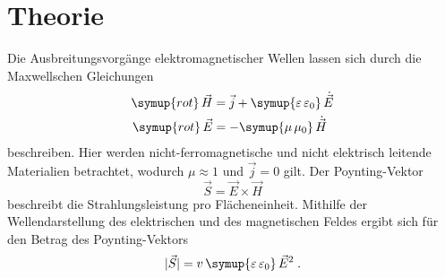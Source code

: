 \section{Theorie}
\label{sec:Theorie}

Die Ausbreitungsvorgänge elektromagnetischer Wellen lassen sich durch die Maxwellschen Gleichungen 
\begin{align*}
    \symup{rot}\, \vec{H} &= \vec{j} + \symup{\varepsilon \,\varepsilon_0}\,\dot{\vec{E}} \\
    \symup{rot}\, \vec{E} &= -\symup{\mu \, \mu_0} \,\dot{\vec{H}}
\end{align*}
beschreiben. Hier werden nicht-ferromagnetische und nicht elektrisch leitende Materialien betrachtet, wodurch $\mu \approx 1$ und
$\vec{j} = 0$ gilt. Der Poynting-Vektor
\begin{equation*}
    \vec{S} = \vec{E} \times \vec{H}
\end{equation*}
beschreibt die Strahlungsleistung pro Flächeneinheit. Mithilfe der Wellendarstellung des elektrischen und des magnetischen Feldes ergibt sich für 
den Betrag des Poynting-Vektors
\begin{equation}
    \lvert \vec{S} \rvert = v \,\symup{\varepsilon \,\varepsilon_0}\, \vec{E}^2 \; .
    \label{eqn:betragS}
\end{equation}

